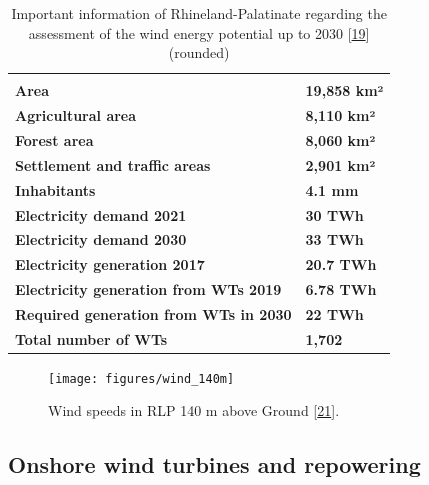\documentclass[a4paper,11pt]{article}
\begin{document}
\begin{table}[H]

\caption{\label{tab:table0}Important information of Rhineland-Palatinate regarding the assessment of the wind energy potential up to 2030 {[}\protect\hyperlink{ref-StateStatisticalOfficeofRhinelandPalatinate.2020}{19}{]} (rounded)}
\centering
\begin{tabular}[t]{>{\raggedright\arraybackslash}p{12cm}>{\raggedright\arraybackslash}p{3cm}}
\toprule
\multicolumn{1}{c}{\textbf{Basic information on Rhineland-Palatinate}} \\
\cmidrule(l{3pt}r{3pt}){1-1}
\textbf{Area} & \textbf{19,858 km²}\\
\midrule
\textbf{Agricultural area} & \textbf{8,110 km²}\\
\midrule
\textbf{Forest area} & \textbf{8,060 km²}\\
\midrule
\textbf{Settlement and traffic areas} & \textbf{2,901 km²}\\
\midrule
\textbf{Inhabitants} & \textbf{4.1 mm}\\
\midrule
\addlinespace
\textbf{Electricity demand 2021} & \textbf{30 TWh}\\
\midrule
\textbf{Electricity demand 2030} & \textbf{33 TWh}\\
\midrule
\textbf{Electricity generation 2017} & \textbf{20.7 TWh}\\
\midrule
\textbf{Electricity generation from WTs 2019} & \textbf{6.78 TWh}\\
\midrule
\textbf{Required generation from WTs in 2030} & \textbf{22 TWh}\\
\midrule
\addlinespace
\textbf{Total number of WTs} & \textbf{1,702}\\
\midrule
\bottomrule
\end{tabular}
\end{table}

\begin{figure}[H]

{\centering \texttt{[image: figures/wind\_140m]} 

}

\caption{Wind speeds in RLP 140 m above Ground {[}\protect\hyperlink{ref-MinisteriumfurWirtschaftKlimaschutzEnergieundLandesplanung.2013}{21}{]}.}\label{fig:wind}
\end{figure}
\hypertarget{onshore-wind-turbines-and-repowering}{%
\subsection{Onshore wind turbines and repowering}\label{onshore-wind-turbines-and-repowering}}
\end{document}
